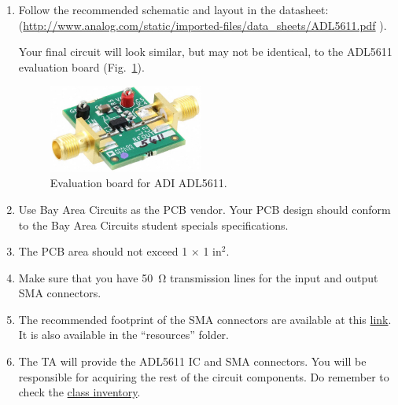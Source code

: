 \documentclass[letterpaper, 11pt]{article}
\begin{document}
\begin{enumerate}
	\item Follow the recommended schematic and layout in the datasheet:\\ (\url{http://www.analog.com/static/imported-files/data_sheets/ADL5611.pdf} ).
	
	 Your final circuit will look similar, but may not be identical, to the ADL5611 evaluation board (Fig.~\ref{fig:adl5611-evalz}).
 
		\begin{figure}[h]
			\centering
			\includegraphics[width=2in]{adl5611-evalz}
			\caption{Evaluation board for ADI ADL5611.}
			\label{fig:adl5611-evalz}
		\end{figure}
	\item Use Bay Area Circuits as the PCB vendor. Your PCB design should conform to the Bay Area Circuits student specials specifications. 
	
	\item The PCB area should not exceed 1 $\times$ 1 in$^2$.
	 
	\item Make sure that you have \SI{50}{\ohm} transmission lines for the input and output SMA connectors.
	
	\item The recommended footprint of the SMA connectors are available at this \href{https://github.com/ucdart/UCD-EEC134/blob/master/labs/lab2/resources/SMA%20Size.jpg}{link}. It is also available in the ``resources'' folder. 
	
	\item The TA will provide the ADL5611 IC and SMA connectors. You will be responsible for acquiring the rest of the circuit components. Do remember to check the \href{https://docs.google.com/spreadsheets/d/1GJnBLUymuVzXjrK0Zkdbc2lwTbw0z9a0JR4bLLzO-Sw/edit#gid=4}{class inventory}. 
	

\end{enumerate}
\end{document}
